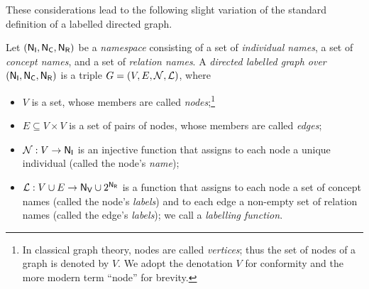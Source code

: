 These considerations lead to the following slight variation
of the standard definition of a labelled directed graph.

%
\begin{definition}
  \label{def:ld_graph}
  Let $(\mathsf{N}_\mathsf{I},\mathsf{N}_\mathsf{C},\mathsf{N}_\mathsf{R})$ be a \emph{namespace} consisting of a set \NI of \emph{individual names}, a set \NC of \emph{concept names}, and a set \NR of \emph{relation names}.
  A \emph{directed labelled graph over $(\mathsf{N}_\mathsf{I},\mathsf{N}_\mathsf{C},\mathsf{N}_\mathsf{R})$} is a triple $G = (V,E,\mathcal{N},\mathcal{L})$,
  where
  \begin{itemize}
    \item
      $V$ is a set, whose members are called \emph{nodes};\footnote{%
        In classical graph theory, nodes are called \emph{vertices}; thus the set of
        nodes of a graph is denoted by $V$. We adopt the denotation $V$ for conformity
        and the more modern term ``node'' for brevity.%
      }      
    \item 
      $E \subseteq V \times V$ is a set of pairs of nodes, whose members are called \emph{edges};
    \item
      $\mathcal{N} : V \to \mathsf{N}_\mathsf{I}$ is an injective function that assigns
      to each node a unique individual (called the node's \emph{name});
    \item
      $\mathcal{L} : V \cup E \to \mathsf{N}_\mathsf{V} \cup 2^{\mathsf{N}_\mathsf{R}}$ is a function that assigns 
      to each node a set of concept names (called the node's \emph{labels}) and
      to each edge a non-empty set of relation names (called the edge's \emph{labels});
      we call \Lmc a \emph{labelling function}.
  \end{itemize}
\end{definition}

